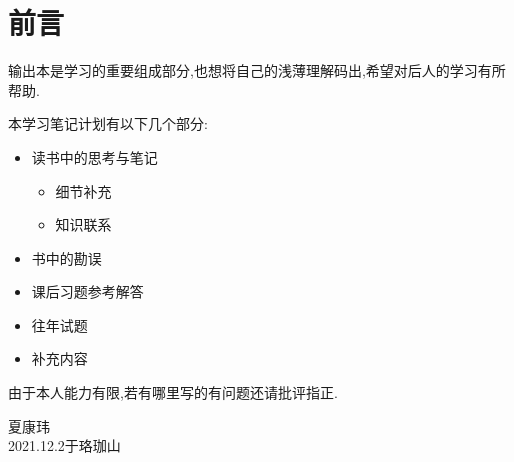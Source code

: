 \chapter{前言}
    输出本是学习的重要组成部分,也想将自己的浅薄理解码出,希望对后人的学习有所帮助.

    本学习笔记计划有以下几个部分:
    \begin{itemize}
        \item 读书中的思考与笔记
            \begin{itemize}
                \item 细节补充
                \item 知识联系
            \end{itemize}
        \item 书中的勘误
        \item 课后习题参考解答
        \item 往年试题
        \item 补充内容
    \end{itemize}
    
    由于本人能力有限,若有哪里写的有问题还请批评指正.
    \begin{flushright}
        夏康玮\\
        2021.12.2于珞珈山
    \end{flushright}

